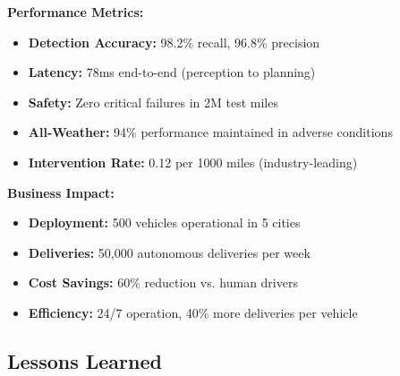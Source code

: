 \textbf{Performance Metrics:}

\begin{itemize}
    \item \textbf{Detection Accuracy:} 98.2\% recall, 96.8\% precision
    \item \textbf{Latency:} 78ms end-to-end (perception to planning)
    \item \textbf{Safety:} Zero critical failures in 2M test miles
    \item \textbf{All-Weather:} 94\% performance maintained in adverse conditions
    \item \textbf{Intervention Rate:} 0.12 per 1000 miles (industry-leading)
\end{itemize}

\textbf{Business Impact:}

\begin{itemize}
    \item \textbf{Deployment:} 500 vehicles operational in 5 cities
    \item \textbf{Deliveries:} 50,000 autonomous deliveries per week
    \item \textbf{Cost Savings:} 60\% reduction vs. human drivers
    \item \textbf{Efficiency:} 24/7 operation, 40\% more deliveries per vehicle
\end{itemize}

\subsection{Lessons Learned}

